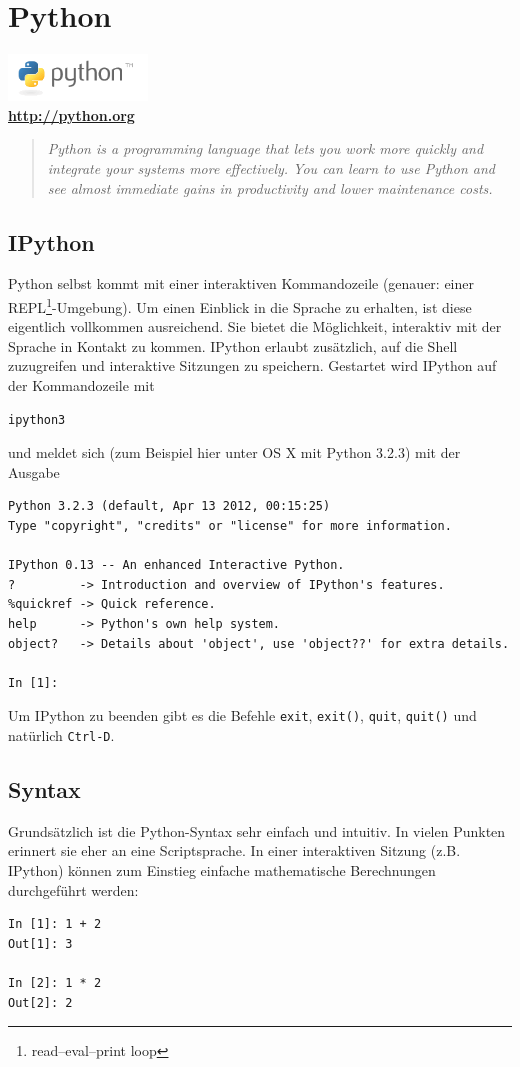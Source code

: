 \chapter{Python}
\begin{center}
  \includegraphics[width=140px]{img/python.png} \\
  \textbf{\url{http://python.org}}
\end{center}
\begin{quote}
  \textit{Python is a programming language that lets you work more quickly and integrate your systems more effectively.
          You can learn to use Python and see almost immediate gains in productivity and lower maintenance costs.}
\end{quote}

\section{IPython}
Python selbst kommt mit einer interaktiven Kommandozeile (genauer: einer REPL\footnote{read–eval–print loop}-Umgebung).
Um einen Einblick in die Sprache zu erhalten, ist diese eigentlich vollkommen ausreichend.
Sie bietet die Möglichkeit, interaktiv mit der Sprache in Kontakt zu kommen.
IPython erlaubt zusätzlich, auf die Shell zuzugreifen und interaktive Sitzungen zu speichern.
Gestartet wird IPython auf der Kommandozeile mit
\begin{verbatim}
ipython3
\end{verbatim}
und meldet sich (zum Beispiel hier unter OS X mit Python 3.2.3) mit der Ausgabe
\begin{verbatim}
Python 3.2.3 (default, Apr 13 2012, 00:15:25) 
Type "copyright", "credits" or "license" for more information.

IPython 0.13 -- An enhanced Interactive Python.
?         -> Introduction and overview of IPython's features.
%quickref -> Quick reference.
help      -> Python's own help system.
object?   -> Details about 'object', use 'object??' for extra details.

In [1]: 
\end{verbatim}
Um IPython zu beenden gibt es die Befehle \texttt{exit}, \texttt{exit()}, \texttt{quit}, \texttt{quit()} und natürlich \texttt{Ctrl-D}.

\section{Syntax}
Grundsätzlich ist die Python-Syntax sehr einfach und intuitiv.
In vielen Punkten erinnert sie eher an eine Scriptsprache.
In einer interaktiven Sitzung (z.B. IPython) können zum Einstieg einfache mathematische Berechnungen durchgeführt werden:
\begin{verbatim}
In [1]: 1 + 2
Out[1]: 3

In [2]: 1 * 2
Out[2]: 2
\end{verbatim}

